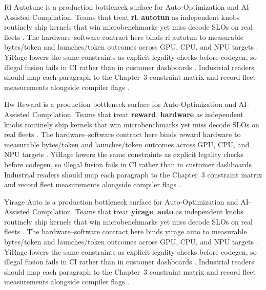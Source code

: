 Rl Autotune is a production bottleneck surface for Auto-Optimization and AI-Assisted Compilation. Teams that treat \textbf{rl}, \textbf{autotun} as independent knobs routinely ship kernels that win microbenchmarks yet miss decode SLOs on real fleets \citep{patel2025llminference,nvidia2022hopper}. The hardware--software contract here binds rl autotun to measurable bytes/token and launches/token outcomes across GPU, CPU, and NPU targets \citep{taxbreak2026,semianalysis2024tma}. YiRage lowers the same constraints as explicit legality checks before codegen, so illegal fusion fails in CI rather than in customer dashboards \citep{memoryfloor2026,amd2024xdna}. Industrial readers should map each paragraph to the Chapter~3 constraint matrix and record fleet measurements alongside compiler flags \citep{nvidia2022hopper,amd2024aie}.

Hw Reward is a production bottleneck surface for Auto-Optimization and AI-Assisted Compilation. Teams that treat \textbf{reward}, \textbf{hardware} as independent knobs routinely ship kernels that win microbenchmarks yet miss decode SLOs on real fleets \citep{taxbreak2026,semianalysis2024tma}. The hardware--software contract here binds reward hardware to measurable bytes/token and launches/token outcomes across GPU, CPU, and NPU targets \citep{memoryfloor2026,amd2024xdna}. YiRage lowers the same constraints as explicit legality checks before codegen, so illegal fusion fails in CI rather than in customer dashboards \citep{nvidia2022hopper,amd2024aie}. Industrial readers should map each paragraph to the Chapter~3 constraint matrix and record fleet measurements alongside compiler flags \citep{semianalysis2024tma,dlbook}.

Yirage Auto is a production bottleneck surface for Auto-Optimization and AI-Assisted Compilation. Teams that treat \textbf{yirage}, \textbf{auto} as independent knobs routinely ship kernels that win microbenchmarks yet miss decode SLOs on real fleets \citep{memoryfloor2026,amd2024xdna}. The hardware--software contract here binds yirage auto to measurable bytes/token and launches/token outcomes across GPU, CPU, and NPU targets \citep{nvidia2022hopper,amd2024aie}. YiRage lowers the same constraints as explicit legality checks before codegen, so illegal fusion fails in CI rather than in customer dashboards \citep{semianalysis2024tma,dlbook}. Industrial readers should map each paragraph to the Chapter~3 constraint matrix and record fleet measurements alongside compiler flags \citep{amd2024xdna,dao2022flashattention}.

